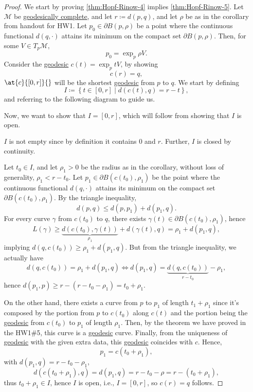 \begin{proof}
	We start by proving \autoref{thm:Hopf-Rinow-4} implies \autoref{thm:Hopf-Rinow-5}. Let \(\mathcal{M} \) be \hyperref[def:geodesically-complete]{geodesically complete}, and let \(r \coloneqq d(p, q)\), and let \(\rho \) be as in the corollary from handout for HW1. Let \(p_0 \in \partial B(p, \rho )\) be a point where the continuous functional \(d(q, \cdot)\) attains its minimum on the compact set \(\partial B(p, \rho )\). Then, for some \(V \in T_p \mathcal{M} \),
	\[
		p_0 = \exp _p \rho V.
	\]
	Consider the \hyperref[def:geodesic]{geodesic} \(c(t) = \exp _p tV\), by showing
	\[
		c(r) = q,
	\]
	\(\at{c}{[0, r]}{} \) will be the shortest \hyperref[def:geodesic]{geodesic} from \(p\) to \(q\). We start by defining
	\[
		I\coloneqq \left\{ t\in[0, r] \mid d(c(t), q) = r-t \right\},
	\]
	and referring to the following diagram to guide us.
	\begin{center}
	\end{center}

	Now, we want to show that \(I = [0, r]\), which will follow from showing that \(I\) is open.
	\begin{note}
		\(I\) is not empty since by definition it contains \(0\) and \(r\). Further, \(I\) is closed by continuity.
	\end{note}
	Let \(t_0 \in I\), and let \(\rho _1 > 0\) be the radius as in the corollary, without loss of generality, \(\rho _1 < r-t_0\). Let \(p_1\in \partial B(c(t_0), \rho _1)\) be the point where the continuous functional \(d(q, \cdot)\) attains its minimum on the compact set \(\partial B(c(t_0), \rho _1)\). By the triangle inequality,
	\[
		d(p, q) \leq d(p, p_1) + d(p_1, q).
	\]
	For every curve \(\gamma \) from \(c(t_0)\) to \(q\), there exists \(\gamma (t)\in \partial B(c(t_0), \rho _1)\), hence
	\[
		L(\gamma )
		\geq \underbrace{d(c(t_0), \gamma (t))}_{\rho _1} + d(\gamma (t), q)
		= \rho _1 + d(p_1, q),
	\]
	implying \(d(q, c(t_0)) \geq \rho _1 + d(p_1, q)\). But from the triangle inequality, we actually have
	\[
		d(q, c(t_0)) = \rho _1 + d(p_1, q)
		\iff d(p_1, q) = \underbrace{d(q, c(t_0))}_{r-t_0} - \rho _1,
	\]
	hence \(d(p_1, p) \geq r-(r-t_0 - \rho _1) = t_0 + \rho _1\).

	On the other hand, there exists a curve from \(p\) to \(p_1\) of length \(t_1 + \rho _1\) since it's composed by the portion from \(p\) to \(c(t_0)\) along \(c(t)\) and the portion being the \hyperref[def:geodesic]{geodesic} from \(c(t_0)\) to \(p_1\) of length \(\rho _1\). Then, by the theorem we have proved in the HW1\#5, this curve is a \hyperref[def:geodesic]{geodesic} curve. Finally, from the uniqueness of \hyperref[def:geodesic]{geodesic} with the given extra data, this \hyperref[def:geodesic]{geodesic} coincides with \(c\). Hence,
	\[
		p_1 = c ( t_0 + \rho _1),
	\]
	with \(d(p_1, q) = r-t_0 - \rho _1\),
	\[
		d(c(t_0 + \rho _1), q)
		= d(p_1, q)
		= r - t_0 - \rho
		= r-(t_0 + \rho _1),
	\]
	thus \(t_0 + \rho _1\in I\), hence \(I\) is open, i.e., \(I = [0, r]\), so \(c(r) = q\) follows.
\end{proof}